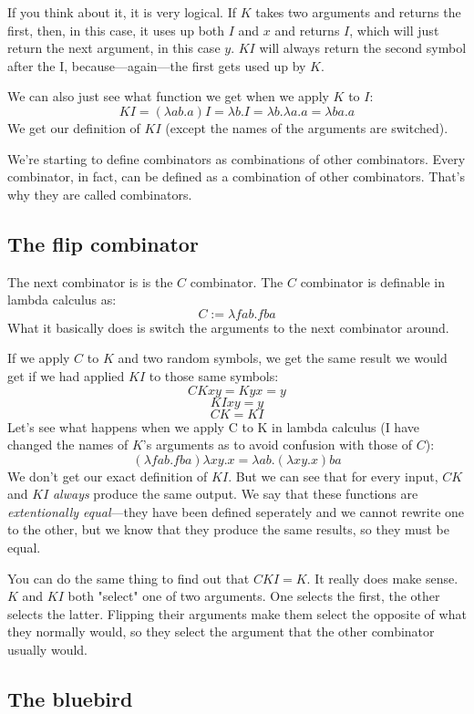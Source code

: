 \documentclass[11pt]{book}
\begin{document}
If you think about it, it is very logical. If \(K\) takes two arguments and
returns the first, then, in this case, it uses up both \(I\) and \(x\) and
returns \(I\), which will just return the next argument, in this case \(y\).
\(KI\) will always return the second symbol after the I, because---again---the
first gets used up by \(K\).

We can also just see what function we get when we apply \(K\) to \(I\):
\[KI=(\lambda ab.a)I=\lambda b.I=\lambda b.\lambda a.a=\lambda ba.a\] We get
our definition of \(KI\) (except the names of the arguments are switched).

We're starting to define combinators as combinations of other combinators.
Every combinator, in fact, can be defined as a combination of other
combinators. That's why they are called combinators.

\subsection{The flip combinator}

The next combinator is is the \(C\) combinator. The \(C\) combinator is
definable in lambda calculus as:
\[C:=\lambda fab.fba\]
What it basically does is switch the arguments to the next combinator around.

If we apply \(C\) to \(K\) and two random symbols, we get the same result we
would get if we had applied \(KI\) to those same symbols:
\[CKxy=Kyx=y\]
\[KIxy=y\]
\[CK=KI\]
Let's see what happens when we apply C to K in lambda calculus (I have changed
the names of \(K\)'s arguments as to avoid confusion with those of \(C\)):
\[(\lambda fab.fba)\lambda xy.x=\lambda ab.(\lambda xy.x)ba\]
We don't get our exact definition of \(KI\). But we can see that for every
input, \(CK\) and \(KI\) \emph{always} produce the same output. We say that
these functions are \emph{extentionally equal}---they have been defined
seperately and we cannot rewrite one to the other, but we know that they
produce the same results, so they must be equal.

You can do the same thing to find out that \(CKI=K\). It really does make
sense. \(K\) and \(KI\) both "select" one of two arguments. One selects the
first, the other selects the latter. Flipping their arguments make them select
the opposite of what they normally would, so they select the argument that the
other combinator usually would.

\subsection{The bluebird}
\end{document}
